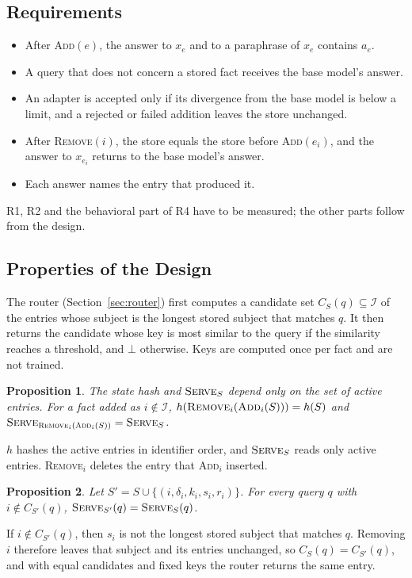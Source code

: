 \documentclass[journal,10pt]{IEEEtran}
\newtheorem{proposition}{Proposition}
\newcommand{\commit}{\textsc{Add}}
\newcommand{\revoke}{\textsc{Remove}}
\newcommand{\serve}{\textsc{Serve}}
\begin{document}
\subsection{Requirements}
\begin{itemize}
\item[R1] After \commit$(e)$, the answer to $x_e$ and to a paraphrase of $x_e$ contains $a_e$.
\item[R2] A query that does not concern a stored fact receives the base model's answer.
\item[R3] An adapter is accepted only if its divergence from the base model is below a limit, and a
rejected or failed addition leaves the store unchanged.
\item[R4] After \revoke$(i)$, the store equals the store before \commit$(e_i)$, and the answer to
$x_{e_i}$ returns to the base model's answer.
\item[R5] Each answer names the entry that produced it.
\end{itemize}
R1, R2 and the behavioral part of R4 have to be measured; the other parts follow from the design.

\subsection{Properties of the Design}
\label{sec:props}
The router (Section~\ref{sec:router}) first computes a candidate set $C_S(q)\subseteq\mathcal{I}$ of the
entries whose subject is the longest stored subject that matches $q$. It then returns the candidate whose
key is most similar to the query if the similarity reaches a threshold, and $\bot$ otherwise. Keys are
computed once per fact and are not trained.

\begin{proposition}\label{prop:identity}
The state hash and $\serve_S$ depend only on the set of active entries. For a fact added as
$i\notin\mathcal{I}$, $h(\revoke_i(\commit_i(S)))=h(S)$ and $\serve_{\revoke_i(\commit_i(S))}=\serve_S$.
\end{proposition}
\begin{IEEEproof}
$h$ hashes the active entries in identifier order, and $\serve_S$ reads only active entries. \revoke$_i$
deletes the entry that \commit$_i$ inserted.
\end{IEEEproof}

\begin{proposition}\label{prop:locality}
Let $S'=S\cup\{(i,\delta_i,k_i,s_i,r_i)\}$. For every query $q$ with $i\notin C_{S'}(q)$,
$\serve_{S'}(q)=\serve_S(q)$.
\end{proposition}
\begin{IEEEproof}
If $i\notin C_{S'}(q)$, then $s_i$ is not the longest stored subject that matches $q$. Removing $i$
therefore leaves that subject and its entries unchanged, so $C_S(q)=C_{S'}(q)$, and with equal candidates
and fixed keys the router returns the same entry.
\end{IEEEproof}
\end{document}
